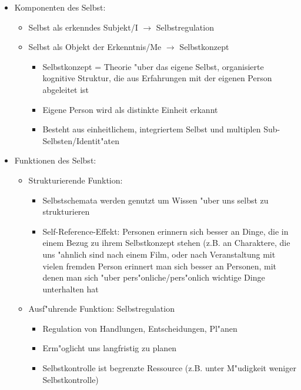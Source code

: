 \begin{itemize}
	\item
		Komponenten des Selbst:
		\begin{itemize}
			\item
				Selbst als erkenndes Subjekt/I  $\rightarrow$ Selbstregulation
			\item
				Selbst als Objekt der Erkenntnis/Me $\rightarrow$ Selbstkonzept
				\begin{itemize}
					\item
						Selbstkonzept = Theorie "uber das eigene Selbst, organisierte kognitive Struktur, die aus Erfahrungen mit der eigenen Person abgeleitet ist
					\item
						Eigene Person wird als distinkte Einheit erkannt
					\item
						Besteht aus einheitlichem, integriertem Selbst und multiplen Sub-Selbsten/Identit"aten
				\end{itemize}
		\end{itemize}
	\item
		Funktionen des Selbst:
		\begin{itemize}
			\item
				Strukturierende Funktion:
				\begin{itemize}
					\item
						Selbstschemata werden genutzt um Wissen "uber uns selbst zu strukturieren
					\item
						Self-Reference-Effekt: Personen erinnern sich besser an Dinge, die in einem Bezug zu ihrem Selbstkonzept stehen (z.B. an Charaktere, die uns "ahnlich sind nach einem Film, oder nach Veranstaltung mit vielen fremden Person erinnert man sich besser an Personen, mit denen man sich "uber pers"onliche/pers"onlich wichtige Dinge unterhalten hat
				\end{itemize}
			\item
				Ausf"uhrende Funktion: Selbstregulation
				\begin{itemize}
					\item
						Regulation von Handlungen, Entscheidungen, Pl"anen
					\item
						Erm"oglicht uns langfristig zu planen
					\item
						Selbstkontrolle ist begrenzte Ressource (z.B. unter M"udigkeit weniger Selbstkontrolle)
				\end{itemize}
		\end{itemize}
\end{itemize}

